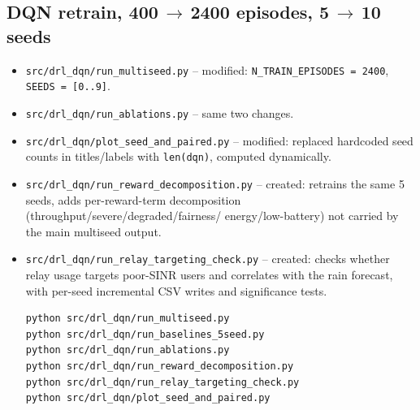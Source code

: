 \documentclass[11pt]{article}
\begin{document}
\subsection{DQN retrain, 400\,$\to$\,2400 episodes, 5\,$\to$\,10 seeds}
\begin{itemize}
  \item \texttt{src/drl\_dqn/run\_multiseed.py} -- modified:
  \texttt{N\_TRAIN\_EPISODES = 2400}, \texttt{SEEDS = [0..9]}.
  \item \texttt{src/drl\_dqn/run\_ablations.py} -- same two changes.
  \item \texttt{src/drl\_dqn/plot\_seed\_and\_paired.py} -- modified: replaced hardcoded
  seed counts in titles/labels with \texttt{len(dqn)}, computed dynamically.
  \item \texttt{src/drl\_dqn/run\_reward\_decomposition.py} -- created: retrains the same
  5 seeds, adds per-reward-term decomposition (throughput/severe/degraded/fairness/
  energy/low-battery) not carried by the main multiseed output.
  \item \texttt{src/drl\_dqn/run\_relay\_targeting\_check.py} -- created: checks whether
  relay usage targets poor-SINR users and correlates with the rain forecast, with
  per-seed incremental CSV writes and significance tests.
  \begin{verbatim}
python src/drl_dqn/run_multiseed.py
python src/drl_dqn/run_baselines_5seed.py
python src/drl_dqn/run_ablations.py
python src/drl_dqn/run_reward_decomposition.py
python src/drl_dqn/run_relay_targeting_check.py
python src/drl_dqn/plot_seed_and_paired.py
  \end{verbatim}
\end{itemize}
\end{document}
